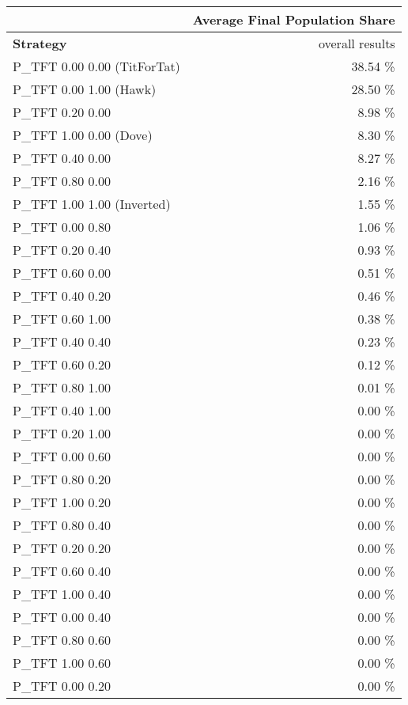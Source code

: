 \begin{tabular}{|l|r|}
\hline
 & \multicolumn{1}{c|}{{\bf Average Final Population Share}} \\
\hline
{\bf Strategy} & overall results\\ \hline
P\_TFT 0.00 0.00 (TitForTat)  &   38.54 \% \\
P\_TFT 0.00 1.00 (Hawk)       &   28.50 \% \\
P\_TFT 0.20 0.00              &    8.98 \% \\
P\_TFT 1.00 0.00 (Dove)       &    8.30 \% \\
P\_TFT 0.40 0.00              &    8.27 \% \\
P\_TFT 0.80 0.00              &    2.16 \% \\
P\_TFT 1.00 1.00 (Inverted)   &    1.55 \% \\
P\_TFT 0.00 0.80              &    1.06 \% \\
P\_TFT 0.20 0.40              &    0.93 \% \\
P\_TFT 0.60 0.00              &    0.51 \% \\
P\_TFT 0.40 0.20              &    0.46 \% \\
P\_TFT 0.60 1.00              &    0.38 \% \\
P\_TFT 0.40 0.40              &    0.23 \% \\
P\_TFT 0.60 0.20              &    0.12 \% \\
P\_TFT 0.80 1.00              &    0.01 \% \\
P\_TFT 0.40 1.00              &    0.00 \% \\
P\_TFT 0.20 1.00              &    0.00 \% \\
P\_TFT 0.00 0.60              &    0.00 \% \\
P\_TFT 0.80 0.20              &    0.00 \% \\
P\_TFT 1.00 0.20              &    0.00 \% \\
P\_TFT 0.80 0.40              &    0.00 \% \\
P\_TFT 0.20 0.20              &    0.00 \% \\
P\_TFT 0.60 0.40              &    0.00 \% \\
P\_TFT 1.00 0.40              &    0.00 \% \\
P\_TFT 0.00 0.40              &    0.00 \% \\
P\_TFT 0.80 0.60              &    0.00 \% \\
P\_TFT 1.00 0.60              &    0.00 \% \\
P\_TFT 0.00 0.20              &    0.00 \% \\

\end{tabular}
